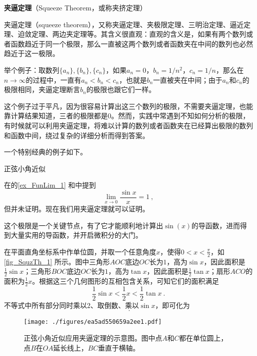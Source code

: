 
\begin{issues}
\issueDraft
\end{issues}
\textbf{夹逼定理}（Squeeze Theorem，或称夹挤定理）



夹逼定理（squeeze theorem），又称夹逼定理、夹极限定理、三明治定理、逼近定理、迫敛定理、两边夹定理等。其含义很直观：直观的含义是，如果有两个数列或者函数趋近于同一个极限，那么一直被这两个数列或者函数夹在中间的数列也必然趋近于这一极限。

举个例子：取数列$\{a_n\}, \{b_n\}, \{c_n\}$，如果$a_n=0$，$b_n=1/n^2$，$c_n=1/n$，那么在$n\to\infty$的过程中，一直有$a_n<b_n<c_n$，也就是$b_n$一直被夹在中间；由于$a_n$和$c_n$的极限相同，夹逼定理断言$b_n$的极限也跟它们一样。


这个例子过于平凡，因为很容易计算出这三个数列的极限，不需要夹逼定理，也能靠计算结果知道，三者的极限都是$0$。然而，实践中常遇到不知如何分析的极限，有时候就可以利用夹逼定理，将难以计算的数列或者函数夹在已经算出极限的数列和函数中间，绕过复杂的详细分析而得到答案。


一个特别经典的例子如下。

\begin{example}{正弦小角近似}

在的\autoref{ex_FunLim_1} 和中提到
\begin{equation}
\lim_{x\to 0}\frac{\sin x}{x}=1~, 
\end{equation}
但并未证明。现在我们用夹逼定理就可以证明。

这个极限是一个关键节点，有了它才能顺利地计算出$\sin(x)$的导函数，进而得到大量实用的导函数，并开启微积分的大门。

在平面直角坐标系中作单位圆，并取一个任意角度$x$，使得$0<x<\frac{\pi}{2}$，如\autoref{fig_SquzTh_1} 所示。图中三角形$AOC$底边$OC$长为$1$，高为$\sin x$，因此面积是$\frac{1}{2}\sin x$；三角形$BOC$底边$OC$长为$1$，高为$\tan x$，因此面积是$\frac{1}{2}\tan x$；扇形$ACO$的面积为$\frac{1}{2}x$。根据这三个几何图形的互相包含关系，可知它们的面积满足
\begin{equation}
\frac{1}{2}\sin x < \frac{1}{2}x < \frac{1}{2}\tan x~. 
\end{equation}
不等式中所有部分同时乘以$2$、取倒数、乘以$\sin x$，即可化为
\begin{equation}
~. 
\end{equation}


\begin{figure}[ht]
\centering
\texttt{[image: ./figures/ea5ad550659a2ee1.pdf]}
\caption{正弦小角近似应用夹逼定理的示意图。图中点$A$和$C$都在单位圆上，点$B$在$OA$延长线上，$BC$垂直于横轴。} \label{fig_SquzTh_1}
\end{figure}



\end{example}








